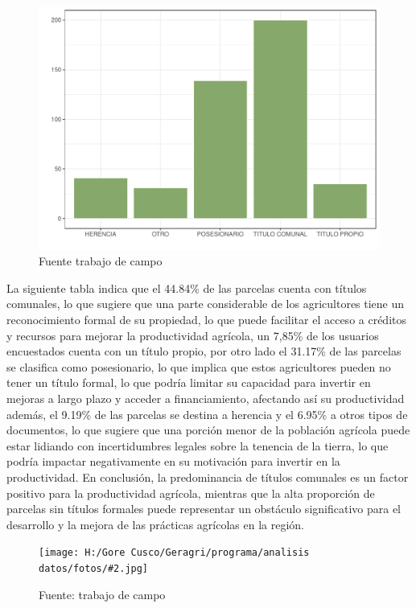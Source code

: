 \documentclass{article}\usepackage[]{graphicx}\usepackage[table]{xcolor}
\makeatletter
\def\maxwidth{ %
  \ifdim\Gin@nat@width>\linewidth
    \linewidth
  \else
    \Gin@nat@width
  \fi
}
\newenvironment{knitrout}{}{} %
\newenvironment{fotos}[2]
{\begin{figure}[H]
	\centering
	\caption{#1}
	\texttt{[image: H:/Gore Cusco/Geragri/programa/analisis datos/fotos/\#2.jpg]}
	\caption*{Fuente: trabajo de campo}}
{\end{figure}}
\newenvironment{graficas}[2]
{\begin{figure}[H]
		\centering
		\caption{#1}
		#2
		\caption*{Fuente trabajo de campo}}
{\end{figure}}
\makeatother
\begin{document}
\begin{graficas}
{Tipo de documento de la parcela}{
\begin{knitrout}
\definecolor{shadecolor}{rgb}{0.969, 0.969, 0.969}\color{fgcolor}
\includegraphics[width=\maxwidth]{figure/fig_diesiete-1} 
\end{knitrout}
}
\end{graficas}
La siguiente tabla indica que el 44.84\% de las parcelas cuenta con títulos comunales, lo que sugiere que una parte considerable de los agricultores tiene un reconocimiento formal de su propiedad, lo que puede facilitar el acceso a créditos y recursos para mejorar la productividad agrícola, un 7,85\% de los usuarios encuestados cuenta con un título propio, por otro lado el 31.17\% de las parcelas se clasifica como posesionario, lo que implica que estos agricultores pueden no tener un título formal, lo que podría limitar su capacidad para invertir en mejoras a largo plazo y acceder a financiamiento, afectando así su productividad además, el 9.19\% de las parcelas se destina a herencia y el 6.95\% a otros tipos de documentos, lo que sugiere que una porción menor de la población agrícola puede estar lidiando con incertidumbres legales sobre la tenencia de la tierra, lo que podría impactar negativamente en su motivación para invertir en la productividad. En conclusión, la predominancia de títulos comunales es un factor positivo para la productividad agrícola, mientras que la alta proporción de parcelas sin títulos formales puede representar un obstáculo significativo para el desarrollo y la mejora de las prácticas agrícolas en la región.
\begin{fotos}
{reconocimiento en campo}{15}
\end{fotos}
\end{document}
